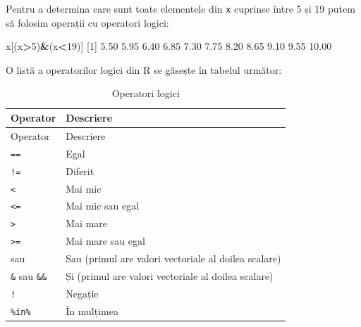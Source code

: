 \documentclass[]{article}
\newenvironment{Shaded}{\begin{snugshade}}{\end{snugshade}}
\newcommand{\DecValTok}[1]{\textcolor[rgb]{0.00,0.00,0.81}{#1}}
\newcommand{\FloatTok}[1]{\textcolor[rgb]{0.00,0.00,0.81}{#1}}
\newcommand{\NormalTok}[1]{#1}
\newcommand{\OperatorTok}[1]{\textcolor[rgb]{0.81,0.36,0.00}{\textbf{#1}}}
\begin{document}
Pentru a determina care sunt toate elementele din \texttt{x} cuprinse
între 5 și 19 putem să folosim operații cu operatori logici:

\begin{Shaded}
\begin{Highlighting}[]
\NormalTok{x[(x}\OperatorTok{>}\DecValTok{5}\NormalTok{)}\OperatorTok{&}\NormalTok{(x}\OperatorTok{<}\DecValTok{19}\NormalTok{)]}
\NormalTok{ [}\DecValTok{1}\NormalTok{]  }\FloatTok{5.50}  \FloatTok{5.95}  \FloatTok{6.40}  \FloatTok{6.85}  \FloatTok{7.30}  \FloatTok{7.75}  \FloatTok{8.20}  \FloatTok{8.65}  \FloatTok{9.10}  \FloatTok{9.55} \FloatTok{10.00}
\end{Highlighting}
\end{Shaded}

O listă a operatorilor logici din R se găsește în tabelul următor:

\begin{longtable}[]{@{}ll@{}}
\caption{Operatori logici}\tabularnewline
\toprule
Operator & Descriere\tabularnewline
\midrule
\endfirsthead
\toprule
Operator & Descriere\tabularnewline
\midrule
\endhead
\texttt{==} & Egal\tabularnewline
\texttt{!=} & Diferit\tabularnewline
\texttt{\textless{}} & Mai mic\tabularnewline
\texttt{\textless{}=} & Mai mic sau egal\tabularnewline
\texttt{\textgreater{}} & Mai mare\tabularnewline
\texttt{\textgreater{}=} & Mai mare sau egal\tabularnewline
\texttt{\textbar{}} sau \texttt{\textbar{}\textbar{}} & Sau (primul are
valori vectoriale al doilea scalare)\tabularnewline
\texttt{\&} sau \texttt{\&\&} & Și (primul are valori vectoriale al
doilea scalare)\tabularnewline
\texttt{!} & Negație\tabularnewline
\texttt{\%in\%} & În mulțimea\tabularnewline
\bottomrule
\end{longtable}
\end{document}
